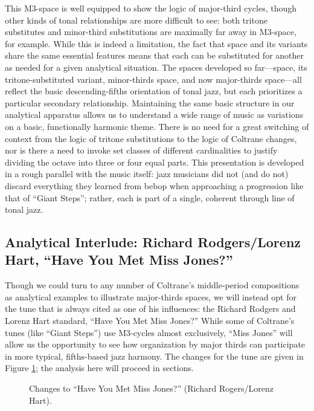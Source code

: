 This M3-space is well equipped to show the logic of major-third cycles, though
other kinds of tonal relationships are more difficult to see: both tritone
substitutes and minor-third substitutions are maximally far away in M3-space,
for example. While this is indeed a limitation, the fact that \tf space and
its variants share the same essential features means that each can be substituted
for another as needed for a given analytical situation. The spaces developed
so far---\tf space, its tritone-substituted variant, minor-thirds space, and
now major-thirds space---all reflect the basic descending-fifths orientation
of tonal jazz, but each prioritizes a particular secondary
relationship. Maintaining the same basic structure in our
analytical apparatus allows us to understand a wide range of music as
variations on a basic, functionally harmonic theme. There is no need for a
great switching of context from the logic of tritone substitutions to the logic
of Coltrane changes, nor is there a need to invoke set classes of different
cardinalities to justify dividing the octave into three or four equal parts.
This presentation is developed in a rough parallel with the music itself: jazz
musicians did not (and do not) discard everything they learned from bebop when
approaching a progression like that of ``Giant Steps''; rather, each is part
of a single, coherent through line of tonal jazz.

\subsection{Analytical Interlude: Richard Rodgers/Lorenz Hart, “Have You Met
  Miss Jones?”}
\label{subsec:miss-jones}

Though we could turn to any number of Coltrane's middle-period compositions as
analytical examples to illustrate major-thirds spaces, we will instead opt for
the tune that is always cited as one of his influences: the Richard Rodgers
and Lorenz Hart standard, ``Have You Met Miss Jones?'' While some of
Coltrane's tunes (like ``Giant Steps'') use M3-cycles almost exclusively,
``Miss Jones'' will allow us the opportunity to see how organization by major
thirds can participate in more typical, fifths-based jazz harmony. The changes
for the tune are given in Figure \ref{maj3:miss-jones-changes}; the analysis
here will proceed in sections.

\begin{figure}[tbp]
  \caption{Changes to ``Have You Met Miss Jones?'' (Richard Rogers/Lorenz Hart).}
\label{maj3:miss-jones-changes}
\end{figure}

